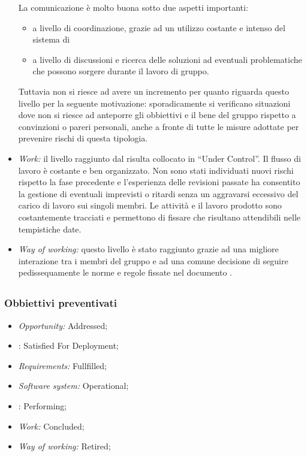 \begin{itemize}
La comunicazione è molto buona sotto due aspetti importanti:
\begin{itemize}
\item a livello di coordinazione, grazie ad un utilizzo costante e intenso del sistema di 
\item a livello di discussioni e ricerca delle soluzioni ad eventuali problematiche che possono sorgere durante il lavoro di gruppo.
\end{itemize}
Tuttavia non si riesce ad avere un incremento per quanto riguarda questo livello per la seguente motivazione: sporadicamente si verificano situazioni dove non si riesce ad anteporre gli obbiettivi e il bene del gruppo rispetto a convinzioni o pareri personali, anche a fronte di tutte le misure adottate per prevenire rischi di questa tipologia.
\item \textit{Work:} il livello raggiunto dal  risulta collocato in ``Under Control''. Il flusso di lavoro è costante e ben organizzato. Non sono stati individuati nuovi rischi rispetto la fase precedente e l'esperienza delle revisioni passate ha consentito la gestione di eventuali imprevisti o ritardi senza un aggravarsi eccessivo del carico di lavoro sui singoli membri.
Le attività e il lavoro prodotto sono costantemente tracciati e permettono di fissare \texttt{} che risultano attendibili nelle tempistiche date.
\item \textit{Way of working:} questo livello è stato raggiunto grazie ad una migliore interazione tra i membri del gruppo e ad una comune decisione di seguire pedissequamente le norme e regole fissate nel documento \NP.
\end{itemize}
\subsection{\fVVt}\label{resocontoSEMAT4}
\subsubsection{Obbiettivi preventivati}
\begin{itemize}
\item \textit{Opportunity:} Addressed;
\item {}: Satisfied For Deployment;
\item \textit{Requirements:} Fullfilled;
\item \textit{Software system:} Operational;
\item {}: Performing;
\item \textit{Work:} Concluded;
\item \textit{Way of working:} Retired;
\end{itemize}
